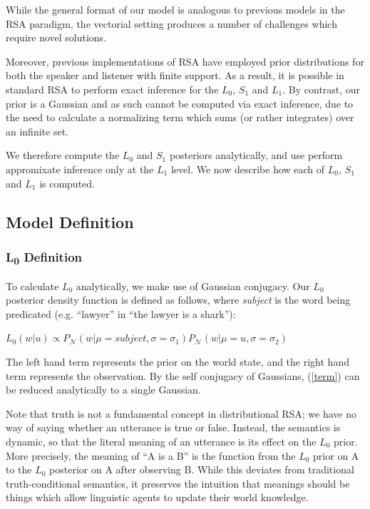 \documentclass[10pt,letterpaper,twocolumn]{article}
\begin{document}
While the general format of our model is analogous to previous models in the RSA paradigm, the vectorial setting produces a number of challenges which require novel solutions.

Moreover, previous implementations of RSA have employed prior distributions for both the speaker and listener with finite support. As a result, it is possible in standard RSA to perform exact inference for the $L_0$, $S_1$ and $L_1$. By contrast, our prior is a Gaussian and as such cannot be computed via exact inference, due to the need to calculate a normalizing term which sums (or rather integrates) over an infinite set. 


We therefore compute the $L_0$ and $S_1$ posteriors analytically, and use perform appromixate inference only at the $L_1$ level. We now describe how each of $L_0$, $S_1$ and $L_1$ is computed.

\subsection{Model Definition}

\subsubsection{L\textsubscript{0} Definition}

To calculate $L_0$ analytically, we make use of Gaussian conjugacy. Our $L_0$ posterior density function is defined as follows, where \emph{subject} is the word being predicated (e.g. ``lawyer'' in ``the lawyer is a shark''):

\begin{exe}
\ex $L_0(w\vert u) \propto P_{\mathcal{N}}(w\vert\mu=subject,\sigma=\sigma_1)P_{\mathcal{N}}(w\vert\mu=u,\sigma=\sigma_2)$ \label{term}
\end{exe}
The left hand term represents the prior on the world state, and the right hand term represents the observation. By the self conjugacy of Gaussians, (\ref{term}) can be reduced analytically to a single Gaussian.

Note that truth is not a fundamental concept in distributional RSA; we have no way of saying whether an utterance is true or false. Instead, the semantics is dynamic, so that the literal meaning of an utterance is its effect on the $L_0$ prior. More precisely, the meaning of ``A is a B'' is the function from the $L_0$ prior on A to the $L_0$ posterior on A after observing B. While this deviates from traditional truth-conditional semantics, it preserves the intuition that meanings should be things which allow linguistic agents to update their world knowledge. 
\end{document}
